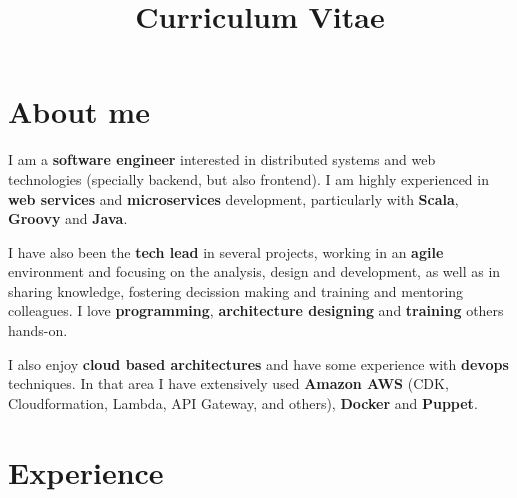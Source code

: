 \documentclass[11pt,a4paper,sans]{moderncv}
\title{Curriculum Vitae}
\begin{document}
\renewcommand{\listitemsymbol}{}

\maketitle

\vspace{-10mm}
\section{About me}

I am a \textbf{software engineer} interested in distributed systems and web technologies (specially backend, but also
frontend). I am highly experienced in \textbf{web services} and \textbf{microservices} development, particularly with
\textbf{Scala}, \textbf{Groovy} and \textbf{Java}.

\vspace{2mm}

I have also been the \textbf{tech lead} in several projects, working in an \textbf{agile} environment and focusing
on the analysis, design and development, as well as in sharing knowledge, fostering decission making and training
and mentoring colleagues. I love \textbf{programming}, \textbf{architecture designing} and \textbf{training} others hands-on.

\vspace{2mm}

I also enjoy \textbf{cloud based architectures} and have some experience with \textbf{devops} techniques. In that area
I have extensively used \textbf{Amazon AWS} (CDK, Cloudformation, Lambda, API Gateway, and others), \textbf{Docker} and
\textbf{Puppet}.

\section{Experience}
\end{document}
